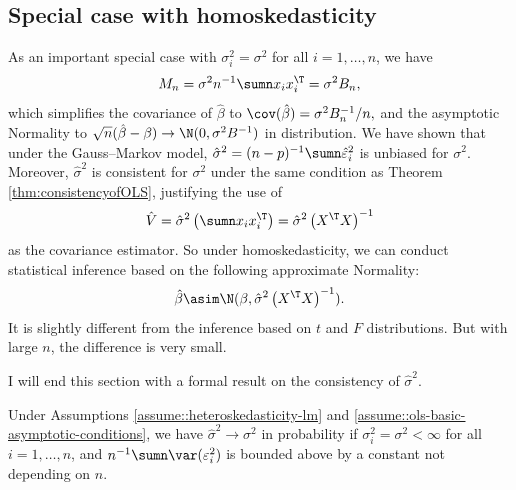 \subsection{Special case with homoskedasticity}
As an important special case with $\sigma_{i}^{2}=\sigma^{2}$ for
all $i=1,\ldots,n$, we have 
\[
M_{n}=\sigma^{2}n^{-1}\sumn x_{i}x_{i}^{\T}=\sigma^{2}B_{n},
\]
which simplifies the covariance of $\hat{\beta}$ to $\cov(\hat{\beta})=\sigma^{2}B_{n}^{-1} / n,$
and the asymptotic Normality to $\sqrt{n}(\hat{\beta}-\beta)\rightarrow\N(0,\sigma^{2}B^{-1})$
in distribution. We have shown that under the Gauss--Markov model,
$\hat{\sigma}^{2}=(n-p)^{-1}\sumn\hat{\varepsilon}_{i}^{2}$ is unbiased
for $\sigma^{2}$. Moreover, $\hat{\sigma}^{2}$ is consistent for
$\sigma^{2}$ under the same condition as Theorem \ref{thm:consistencyofOLS},
justifying the use of 
\[
\hat{V} = 
\hat{\sigma}^{2}\left(\sumn x_{i}x_{i}^{\T}\right)=\hat{\sigma}^{2}\left(X^{\T}X\right)^{-1}
\]
as the covariance estimator. So under homoskedasticity, we can conduct statistical inference based on the following approximate Normality:
\[
\hat{\beta}\asim\N(\beta,\hat{\sigma}^{2}\left(X^{\T}X\right)^{-1}).
\]
It is slightly different from the inference based on $t$ and $F$ distributions. But with large $n$, the difference is very small.


I will end this section with a formal result on the consistency of
$\hat{\sigma}^{2}.$



\begin{theorem}\label{thm::homoskeda-asymptotic}
Under Assumptions \ref{assume::heteroskedasticity-lm} and \ref{assume::ols-basic-asymptotic-conditions},  we have $\hat{\sigma}^{2}\rightarrow\sigma^{2}$ in probability if 
 $\sigma_{i}^{2}=\sigma^{2}<\infty$ for all $i=1,\ldots,n$, and $n^{-1} \sumn \var(\varepsilon_i^2  ) $ is bounded above by a constant not depending on $n$. 
\end{theorem}


